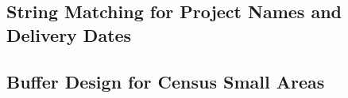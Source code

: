 \documentclass[12pt]{article}
\begin{document}
\subsection{String Matching for Project Names and Delivery Dates }
\label{appendix:stringmatch}

\begin{center}
{}
\end{center}

\subsection{Buffer Design for Census Small Areas}
\end{document}
